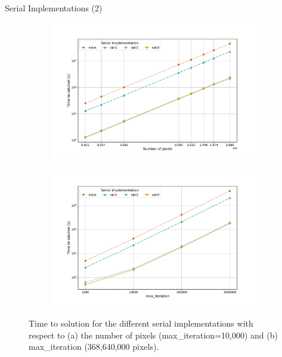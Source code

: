 \documentclass[10pt]{beamer}
\begin{document}
\begin{frame}{Serial Implementations (2)}

\begin{figure}
	\begin{subfigure}{.6\textwidth}
		\centering
		\hspace{-2cm}
		\includegraphics[width=.98\linewidth, clip, trim={1.5cm 1cm 2.5cm 2cm}]{serial-optis-px.pdf}
		\caption{} 
		\label{fig:serial-optis-px}
	\end{subfigure}%
	\begin{subfigure}{.6\textwidth}
		\centering
		\hspace{-2.5cm}
		\includegraphics[width=.98\linewidth, clip, trim={1.5cm 1cm 2.5cm 2cm}]{serial-optis-maxiter.pdf}
		\caption{} 
		\label{fig:serial-optis-maxiter}
	\end{subfigure}
	\vspace{-0.4cm}
	\caption{Time to solution for the different serial implementations with respect to (a) the number of pixels (max\_iteration=10,000) and (b) max\_iteration (368,640,000 pixels).}
	\label{fig:serial-optis}
\end{figure}

\end{frame}
\end{document}
